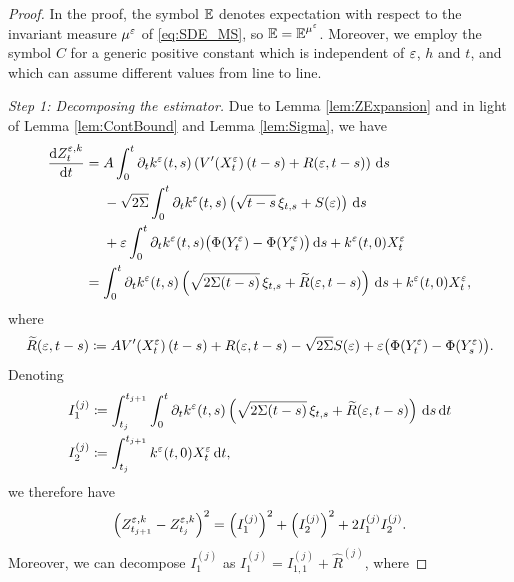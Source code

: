 \documentclass[10pt]{article}
\begin{document}
\begin{proof} In the proof, the symbol $\operatorname{\mathbb{E}}$ denotes expectation with respect to the invariant measure $\mu^\varepsilon$ of \eqref{eq:SDE_MS}, so $\operatorname{\mathbb{E}} = \operatorname{\mathbb{E}}^{\mu^\varepsilon}$. Moreover, we employ the symbol $C$ for a generic positive constant which is independent of $\varepsilon$, $h$ and $t$, and which can assume different values from line to line.
	
\textit{Step 1: Decomposing the estimator.} Due to Lemma \ref{lem:ZExpansion} and in light of Lemma \ref{lem:ContBound} and Lemma \ref{lem:Sigma}, we have
\begin{equation}
\begin{aligned}
	\frac{\mathrm{d} Z^{\varepsilon,k}_t}{\mathrm{d} t} &= 
	\begin{aligned}[t] 
	&A \int_0^t \partial_t k^\varepsilon(t, s) \left( V'(X^\varepsilon_t)\,(t-s) + R(\varepsilon, t-s)\right) \,\mathrm{d} s  \\
	&-\sqrt{2\Sigma} \int_0^t \partial_t k^\varepsilon(t, s) \left( \sqrt{t-s} \, \xi_{t,s} + S(\varepsilon) \right)\,\mathrm{d} s\\
	&+ \varepsilon \int_0^t \partial_t k^\varepsilon(t, s) \big(\Phi(Y^\varepsilon_t)- \Phi(Y^\varepsilon_s)\big) \,\mathrm{d} s + k^\varepsilon(t, 0) X^\varepsilon_t
	\end{aligned}
	\\
	&= \int_0^t \partial_t k^\varepsilon(t, s)\left(\sqrt{2\Sigma(t-s)} \, \xi_{t,s} + \widetilde R(\varepsilon, t - s)\right) \,\mathrm{d} s + k^\varepsilon(t, 0) X^\varepsilon_t,
\end{aligned}
\end{equation}
where
\begin{equation}
	\widetilde R(\varepsilon, t - s) \coloneqq AV'(X^\varepsilon_t)\,(t-s) + R(\varepsilon, t-s) - \sqrt{2\Sigma} S(\varepsilon) + \varepsilon \big(\Phi(Y^\varepsilon_t)- \Phi(Y^\varepsilon_s)\big).
\end{equation}
Denoting
\begin{equation}
\begin{aligned}
	I_1^{(j)} &\coloneqq \int_{t_j}^{t_{j+1}}\int_0^t \partial_t k^\varepsilon(t, s)\left(\sqrt{2\Sigma(t-s)} \, \xi_{t,s} + \widetilde R(\varepsilon, t - s)\right) \,\mathrm{d} s \,\mathrm{d} t\\
	I_2^{(j)} &\coloneqq \int_{t_j}^{t_{j+1}} k^\varepsilon(t, 0) X^\varepsilon_t \,\mathrm{d} t,
\end{aligned}
\end{equation}
we therefore have
\begin{equation}
	\left(Z^{\varepsilon,k}_{t_{j+1}} - Z^{\varepsilon,k}_{t_j}\right)^2 = \left(I_1^{(j)}\right)^2 + \left(I_2^{(j)}\right)^2 + 2I_1^{(j)}I_2^{(j)}.
\end{equation}
Moreover, we can decompose $I_1^{(j)}$ as $I_1^{(j)} = I_{1,1}^{(j)} + \widehat R^{(j)}$, where

\end{proof}
\end{document}
